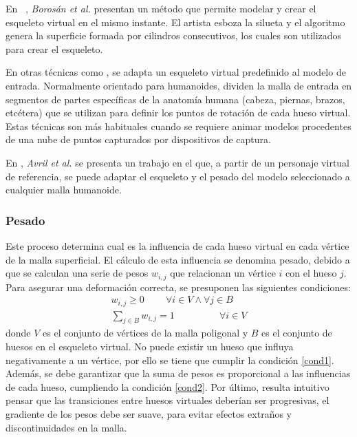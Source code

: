 En ~\cite{borosan2012rigmesh}, \emph{Borosán et al.} presentan un método que permite modelar y crear el esqueleto virtual en el mismo instante. El artista esboza la silueta y el algoritmo genera la superficie formada por cilindros consecutivos, los cuales son utilizados para crear el esqueleto.


En otras técnicas como \cite{huang2013robust}, se adapta un esqueleto virtual predefinido al modelo de entrada. Normalmente orientado para humanoides, dividen la malla de entrada en segmentos de partes específicas de la anatomía humana (cabeza, piernas, brazos, etcétera) que se utilizan para definir los puntos de rotación de cada hueso virtual. Estas técnicas son más habituales cuando se requiere animar modelos procedentes de una nube de puntos capturados por dispositivos de captura.

En \cite{avril2016animation}, \emph{Avril et al.} se presenta un trabajo en el que, a partir de un personaje virtual de referencia, se puede adaptar el esqueleto y el pesado del modelo seleccionado a cualquier malla humanoide.


\subsubsection{Pesado}
\label{art:pesado}

Este proceso determina cual es la influencia de cada hueso virtual en cada vértice de la malla superficial.
El cálculo de esta influencia se denomina pesado, debido a que se calculan una serie de pesos $w_{i,j}$ que relacionan un vértice $i$ con el hueso $j$.
Para asegurar una deformación correcta, se presuponen las siguientes condiciones:
\begin{eqnarray}
\label{cond1}
w_{i,j}\geq 0 \;\;\;\;\;\;\;\; \forall i \in V \wedge \forall j \in B   \\
\label{cond2}
\sum_{j \in B} w_{i,j} = 1\ \;\;\;\;\;\;\;\;\;\;\;\;\;\;\;\;
\forall i \in V
\end{eqnarray}
donde $V$ es el conjunto de vértices de la malla poligonal y $B$ es el conjunto de huesos en el esqueleto virtual. No puede existir un hueso que influya negativamente a un vértice, por ello se tiene que cumplir la condición \ref{cond1}. %
Además, se debe garantizar que la suma de pesos es proporcional a las influencias de cada hueso, cumpliendo la condición \ref{cond2}.
Por último, resulta intuitivo pensar que las transiciones entre huesos virtuales deberían ser progresivas, el gradiente de los pesos debe ser suave, para evitar efectos extraños y discontinuidades en la malla.

